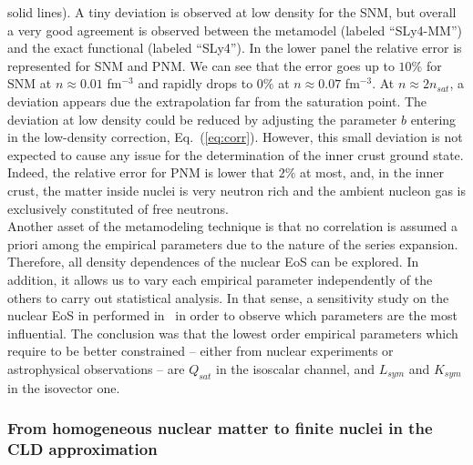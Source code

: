 solid lines). A tiny deviation is observed at low density for the SNM, but 
overall a very good agreement is observed between the metamodel (labeled
``SLy4-MM'') and the exact functional (labeled ``SLy4''). In the lower panel 
the relative error is represented for
SNM and PNM. We can see that the error goes up to $10\%$ for SNM at $n \approx
0.01$ fm$^{-3}$ and rapidly drops to $0\%$ at $n \approx 0.07$
fm$^{-3}$. At $n \approx 2n_{sat}$, a deviation appears due the extrapolation far
from the saturation point. The deviation at low density could be reduced by 
adjusting the parameter $b$ entering in the low-density correction,
Eq.~(\ref{eq:corr}). However,
this small deviation is not expected to cause any issue for the determination
of the inner crust ground state. Indeed, the relative error for PNM is lower 
that $2\%$ at most, and, in the inner crust, the matter inside nuclei is very 
neutron rich and the ambient nucleon gas is exclusively constituted of free
neutrons.\\
Another asset of the metamodeling technique is that no correlation is assumed
a priori among the empirical parameters due to the nature of the
series expansion. Therefore, all density dependences of the
nuclear EoS can be explored. In addition, it allows us to vary each empirical 
parameter independently of the others to carry out statistical analysis. 
In that sense, a sensitivity study on
the nuclear EoS in performed in~\cite{Margueron2018a} in order to observe which
parameters are the most influential. The conclusion was that the lowest order
empirical parameters which require to be better constrained -- either from
nuclear experiments or astrophysical observations -- are $Q_{sat}$ in 
the isoscalar channel, and $L_{sym}$ and $K_{sym}$ in the isovector one.

\subsubsection{From homogeneous nuclear matter to finite nuclei in the CLD 
approximation}

